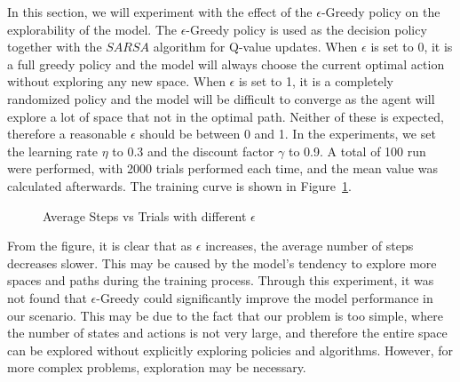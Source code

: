 \documentclass[conference]{IEEEtran}
\begin{document}
In this section, we will experiment with the effect of the \({\epsilon}\)-Greedy policy on the explorability of the model. The \({\epsilon}\)-Greedy policy is used as the decision policy together with the \(SARSA\) algorithm for Q-value updates. When \({\epsilon}\) is set to 0, it is a full greedy policy and the model will always choose the current optimal action without exploring any new space. When \({\epsilon}\) is set to 1, it is a completely randomized policy and the model will be difficult to converge as the agent will explore a lot of space that not in the optimal path. Neither of these is expected, therefore a reasonable \({\epsilon}\) should be between 0 and 1. In the experiments, we set the learning rate \({\eta}\) to 0.3 and the discount factor \({\gamma}\) to 0.9. A total of 100 run were performed, with 2000 trials performed each time, and the mean value was calculated afterwards. The training curve is shown in Figure~\ref{fig:exploration}.

\begin{figure}[!ht]
    \centering
    \caption{Average Steps vs Trials with different \({\epsilon}\)}\label{fig:exploration}
\end{figure}

From the figure, it is clear that as \({\epsilon}\) increases, the average number of steps decreases slower. This may be caused by the model's tendency to explore more spaces and paths during the training process. Through this experiment, it was not found that \({\epsilon}\)-Greedy could significantly improve the model performance in our scenario. This may be due to the fact that our problem is too simple, where the number of states and actions is not very large, and therefore the entire space can be explored without explicitly exploring policies and algorithms. However, for more complex problems, exploration may be necessary.
\end{document}
